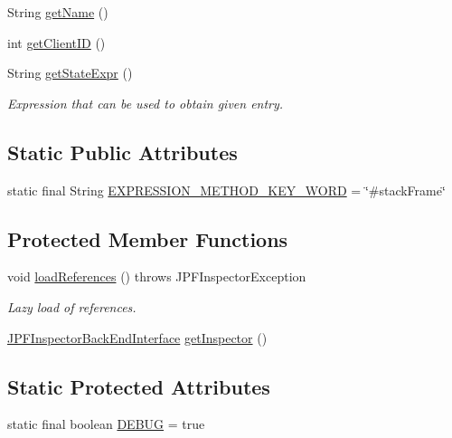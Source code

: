 \begin{DoxyCompactItemize}
String \hyperlink{classgov_1_1nasa_1_1jpf_1_1inspector_1_1common_1_1pse_1_1_program_state_entry_ac96b4ceba0c8c9c674b0cca509b63a3b}{get\+Name} ()
\item 
int \hyperlink{classgov_1_1nasa_1_1jpf_1_1inspector_1_1common_1_1pse_1_1_program_state_entry_a5f1b62c50f124c1bd01be0111706a1f5}{get\+Client\+ID} ()
\item 
String \hyperlink{classgov_1_1nasa_1_1jpf_1_1inspector_1_1common_1_1pse_1_1_program_state_entry_a9d819571ca1cc982a7d31df70548fd96}{get\+State\+Expr} ()
\begin{DoxyCompactList}\small\item\em Expression that can be used to obtain given entry. \end{DoxyCompactList}\end{DoxyCompactItemize}
\subsection*{Static Public Attributes}
\begin{DoxyCompactItemize}
\item 
static final String \hyperlink{classgov_1_1nasa_1_1jpf_1_1inspector_1_1common_1_1pse_1_1_p_s_e_method_a20fb23ba726eea499f133443c653f8c7}{E\+X\+P\+R\+E\+S\+S\+I\+O\+N\+\_\+\+M\+E\+T\+H\+O\+D\+\_\+\+K\+E\+Y\+\_\+\+W\+O\+RD} = \char`\"{}\#stack\+Frame\char`\"{}
\end{DoxyCompactItemize}
\subsection*{Protected Member Functions}
\begin{DoxyCompactItemize}
\item 
void \hyperlink{classgov_1_1nasa_1_1jpf_1_1inspector_1_1common_1_1pse_1_1_p_s_e_method_afd16ff520c37a17f7c7a2260a6c52f32}{load\+References} ()  throws J\+P\+F\+Inspector\+Exception 
\begin{DoxyCompactList}\small\item\em Lazy load of references. \end{DoxyCompactList}\item 
\hyperlink{interfacegov_1_1nasa_1_1jpf_1_1inspector_1_1interfaces_1_1_j_p_f_inspector_back_end_interface}{J\+P\+F\+Inspector\+Back\+End\+Interface} \hyperlink{classgov_1_1nasa_1_1jpf_1_1inspector_1_1common_1_1pse_1_1_program_state_entry_ab04eadea7420b70405969a6b95656411}{get\+Inspector} ()
\end{DoxyCompactItemize}
\subsection*{Static Protected Attributes}
\begin{DoxyCompactItemize}
\item 
static final boolean \hyperlink{classgov_1_1nasa_1_1jpf_1_1inspector_1_1common_1_1pse_1_1_program_state_entry_a84ef5e9f23ec651d7a67a8ee72819b0e}{D\+E\+B\+UG} = true
\end{DoxyCompactItemize}
